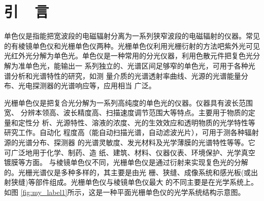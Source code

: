 \documentclass{buaaemp}
\begin{document}



\wuhao 

\section{引~~言}
单色仪是指能把宽波段的电磁辐射分离为一系列狭窄波段的电磁辐射的仪器。常见的有棱镜单色仪和光栅单色仪两种。光栅单色仪利用光栅衍射的方法吧紫外光可见光红外光分解为单色光。单色仪是一种常用的分光仪器，利用色散元件把复色光分解为准单色光，能输出一
系列独立的、光谱区间足够窄的单色光，可用于各种光谱分析和光谱特性的研究，如测
量介质的光谱透射率曲线、光源的光谱能量分布、光电探测器的光谱响应等，应用相当
广泛。

光栅单色仪是把复合光分解为一系列高纯度的单色光的仪器。仪器具有波长范围宽、
分辨本领高、波长精度高、扫描速度调节范围大等特点。主要用于物质的定量和定性分
析、光源特性、溶液的浓度、光的生效效应和透明物质的光学特性等研究工作。自动化
程度高（能自动扫描光谱，自动滤波光片），可用于测各种辐射源的光谱分布、探测器
的光谱灵敏度、发光材料及光学薄膜的光谱特性等等。它可广泛地用于化学、制药、造
纸、建筑、材料、仪器仪表、环境保护、光学真空镀膜等方面。
与棱镜单色仪不同，光栅单色仪是通过衍射来实现复色光的分解的。光栅光谱仪是多种多样的，其主要是由光
栅、狭缝、成像系统和感光板(或出射狭缝)等部件组成。光栅单色仪与棱镜单色仪最大
的不同主要是在光学系统上。如图 \ref{fig:my_label1}所示，这是一种平面光栅单色仪的光学系统结构示意图。
\end{document}
